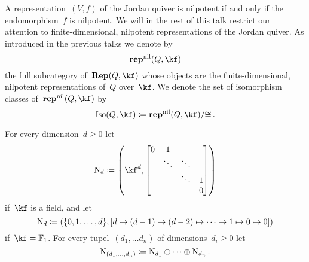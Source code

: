 \documentclass[a4paper,11pt]{scrartcl}
\begin{document}
A representation~$(V, f)$ of the Jordan quiver is nilpotent if and only if the endomorphism~$f$ is nilpotent.
We will in the rest of this talk restrict our attention to finite-dimensional, nilpotent representations of the Jordan quiver.
As introduced in the previous talks we denote by
\[
  \repnil(Q, \kf)
\]
the full subcategory of~$\Rep(Q, \kf)$ whose objects are the finite-dimensional, nilpotent representations of~$Q$ over~$\kf$.
We denote the set of isomorphism classes of~$\repnil(Q, \kf)$ by
\[
  \Iso(Q, \kf)
  \defined
  \repnil(Q, \kf) / {\cong} \,.
\]

\begin{definition}
  For every dimension~$d \geq 0$ let
  \[
    \Nil_d
    \defined
    \left(
      \kf^d,
      \begin{bmatrix}
        0 & 1       &         &   \\
          & \ddots  & \ddots  &   \\
          &         & \ddots  & 1 \\
          &         &         & 0
      \end{bmatrix}
    \right)
  \]
  if~$\kf$ is a field, and let
  \[
    \mathrm{N}_d
    \coloneqq
    (
      \{ 0, 1, \dotsc, d \},
      [d \mapsto (d-1) \mapsto (d-2) \mapsto \dotsb \mapsto 1 \mapsto 0 \mapsto 0]
    )
  \]
  if~$\kf = \Finite_1$.
  For every tupel~$(d_1, \dotsc d_n)$ of dimensions~$d_i \geq 0$ let
  \[
    \mathrm{N}_{(d_1, \dotsc, d_n)}
    \coloneqq
    \mathrm{N}_{d_1} \oplus \dotsb \oplus \mathrm{N}_{d_n} \,.
  \]
\end{definition}
\end{document}

